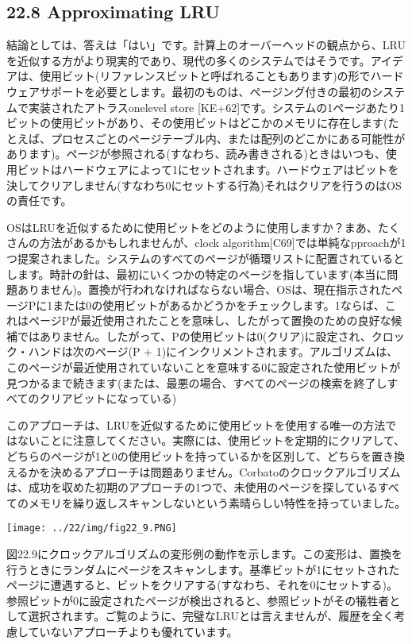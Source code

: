 \hypertarget{approximating-lru}{%
\subsection*{22.8 Approximating LRU}\label{approximating-lru}}

結論としては、答えは「はい」です。計算上のオーバーヘッドの観点から、LRUを近似する方がより現実的であり、現代の多くのシステムではそうです。アイデアは、使用ビット(リファレンスビットと呼ばれることもあります)の形でハードウェアサポートを必要とします。最初のものは、ページング付きの最初のシステムで実装されたアトラスonelevel
store
{[}KE+62{]}です。システムの1ページあたり1ビットの使用ビットがあり、その使用ビットはどこかのメモリに存在します(たとえば、プロセスごとのページテーブル内、または配列のどこかにある可能性があります)。ページが参照される(すなわち、読み書きされる)ときはいつも、使用ビットはハードウェアによって1にセットされます。ハードウェアはビットを決してクリアしません(すなわち0にセットする行為)それはクリアを行うのはOSの責任です。

OSはLRUを近似するために使用ビットをどのように使用しますか？まあ、たくさんの方法があるかもしれませんが、clock
algorithm{[}C69{]}では単純なpproachが1つ提案されました。システムのすべてのページが循環リストに配置されているとします。時計の針は、最初にいくつかの特定のページを指しています(本当に問題ありません)。置換が行われなければならない場合、OSは、現在指示されたページPに1または0の使用ビットがあるかどうかをチェックします。1ならば、これはページPが最近使用されたことを意味し、したがって置換のための良好な候補ではありません。したがって、Pの使用ビットは0(クリア)に設定され、クロック・ハンドは次のページ(P
+
1)にインクリメントされます。アルゴリズムは、このページが最近使用されていないことを意味する0に設定された使用ビットが見つかるまで続きます(または、最悪の場合、すべてのページの検索を終了しすべてのクリアビットになっている)

このアプローチは、LRUを近似するために使用ビットを使用する唯一の方法ではないことに注意してください。実際には、使用ビットを定期的にクリアして、どちらのページが1と0の使用ビットを持っているかを区別して、どちらを置き換えるかを決めるアプローチは問題ありません。Corbatoのクロックアルゴリズムは、成功を収めた初期のアプローチの1つで、未使用のページを探しているすべてのメモリを繰り返しスキャンしないという素晴らしい特性を持っていました。

\texttt{[image: ../22/img/fig22\_9.PNG]}

図22.9にクロックアルゴリズムの変形例の動作を示します。この変形は、置換を行うときにランダムにページをスキャンします。基準ビットが1にセットされたページに遭遇すると、ビットをクリアする(すなわち、それを0にセットする)。参照ビットが0に設定されたページが検出されると、参照ビットがその犠牲者として選択されます。ご覧のように、完璧なLRUとは言えませんが、履歴を全く考慮していないアプローチよりも優れています。

